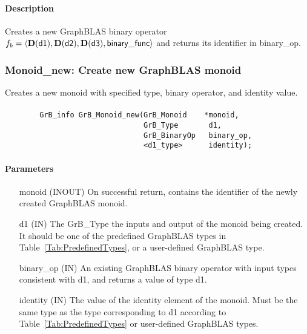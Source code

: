 \paragraph{Description}

Creates a new GraphBLAS binary operator $f_b = \langle \bold{D}({\sf d1}), 
\bold{D}({\sf d2}), \bold{D}({\sf d3}), {\sf binary\_func} \rangle$ and returns its identifier in {\sf binary\_op}.



\subsubsection{{\sf Monoid\_new}: Create new GraphBLAS monoid}

Creates a new monoid with specified type, binary operator, and identity value.

\paragraph{\syntax}

\begin{verbatim}
        GrB_info GrB_Monoid_new(GrB_Monoid    *monoid,
                                GrB_Type       d1,
                                GrB_BinaryOp   binary_op,
                                <d1_type>      identity);
\end{verbatim}

\paragraph{Parameters}

\begin{itemize}[leftmargin=1.1in]
    \item[{\sf monoid}] ({\sf INOUT}) On successful return, contains the identifier 
    of the newly created GraphBLAS monoid.
    \item[{\sf d1}] ({\sf IN}) The {\sf GrB\_Type} the inputs and output of the 
    monoid being created. It should be one of the predefined GraphBLAS types in
    Table~\ref{Tab:PredefinedTypes}, or a user-defined GraphBLAS type.
    \item[{\sf binary\_op}] ({\sf IN}) An existing GraphBLAS binary operator with input types 
    consistent with {\sf d1}, and returns a value of type {\sf d1}. 
    \item[{\sf identity}]  ({\sf IN}) The value of the identity element of the 
    monoid. Must be the same type as the type corresponding to {\sf d1} according to
    Table~\ref{Tab:PredefinedTypes} or user-defined GraphBLAS types.
\end{itemize}

